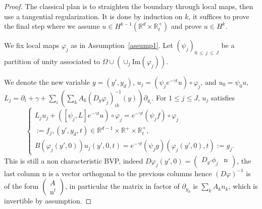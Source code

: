 \documentclass[AHL,Unicode,longabstracts,published]{cedram}
\newcommand{\R}{\mathbb{R}}
\newcommand{\rmn}{\mathrm{n}}
\renewcommand{\Im}{\mathrm{Im}}
\begin{document}
\begin{proof}
The classical plan is to straighten the boundary through local maps, then use a tangential regularization. It is done by induction on $k$, it suffices to prove the final step where we assume $u\in H^{k-1}(\R^d\times \R_t^+)$ and prove $u\in H^k$.


We fix local maps $\varphi_j$ as in Assumption~\ref{assump1}. Let $(\psi_j)_{0\,\leq\,j\,\leq\,J}$ be a partition of unity associated to $\Omega\cup (\cup_j\Im(\varphi_j))$.


\noindent We denote the new variable $y=(y',y_d)$, $u_j=(\psi_je^{-\gamma t}u)
\circ\varphi_j$, and $u_0=\psi_0 u$, $L_j=\partial_t+\gamma+\sum_i\left(\sum_k A_k(D_y\varphi_j)^{-1}_{ik}(y)\right)
\partial_{y_i}$. For $1\leq j\leq J$, $u_j$ satisfies
\begin{equation}\label{eqredresse}
\left\{
\begin{array}{ll}
L_ju_j+\left([\psi_j,L]e^{-\gamma t}u\right)\circ \varphi_j=e^{-\gamma t}(\psi_jf)\circ \varphi_j\\
:=f_j, \left(y',y_d,t\right)\in \R^{d-1}\times \R^+\times \R_t^+,
\\
B(\varphi_j(y',0))u_j(y',0,t)=e^{-\gamma t}(\psi_j g)(\varphi_j(y',0),t):=g_j.
\end{array}
\right.
\end{equation}
This is still a non characteristic BVP, indeed $D\varphi_j(y',0)=
(\begin{smallmatrix} D_{y'}\phi_j & \rmn
\end{smallmatrix})$, the
last column $\rmn$ is a vector orthogonal to the previous columns hence $(D\varphi)^{-1}$ is of the form $
(\begin{smallmatrix} A\\ \rmn^t
\end{smallmatrix})$, in particular the matrix in factor of
$\partial_{y_d}$ is $\sum_kA_k n_k$, which is invertible by assumption.



\end{proof}
\end{document}
